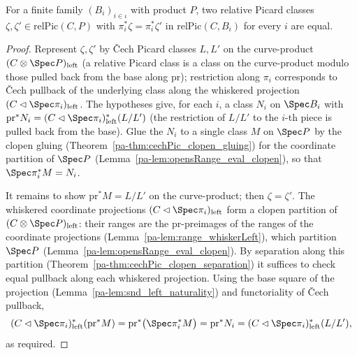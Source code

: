 \begin{theorem}
  \label{pa-thm:relPic_pi_separation}
  \leanok

  For a finite family \((B_i)_{i \in \iota}\) with product \(P\), two relative Picard classes
  \(\zeta, \zeta' \in \mathrm{relPic}(C, P)\) with \(\pi_i^{*}\zeta = \pi_i^{*}\zeta'\) in
  \(\mathrm{relPic}(C, B_i)\) for every \(i\) are equal.
\end{theorem}
\begin{proof}
  \leanok
  Represent \(\zeta, \zeta'\) by \v Cech Picard classes \(L, L'\) on the curve-product
  \((C \otimes \Spec P)_{\mathrm{left}}\) (a relative Picard class is a class on the curve-product
  modulo those pulled back from the base along \(\mathrm{pr}\)); restriction along \(\pi_i\)
  corresponds to \v Cech pullback of the underlying class along the whiskered projection
  \((C \lhd \Spec \pi_i)_{\mathrm{left}}\). The hypotheses give, for each \(i\), a class \(N_i\) on
  \(\Spec B_i\) with \(\mathrm{pr}^{*}N_i = (C \lhd \Spec\pi_i)_{\mathrm{left}}^{*}(L/L')\) (the
  restriction of \(L/L'\) to the \(i\)-th piece is pulled back from the base). Glue the \(N_i\) to a
  single class \(M\) on \(\Spec P\) by the clopen gluing (Theorem~\ref{pa-thm:cechPic_clopen_gluing})
  for the coordinate partition of \(\Spec P\) (Lemma~\ref{pa-lem:opensRange_eval_clopen}), so that
  \(\Spec\pi_i^{*} M = N_i\).

  It remains to show \(\mathrm{pr}^{*} M = L/L'\) on the curve-product; then \(\zeta = \zeta'\). The
  whiskered coordinate projections \((C \lhd \Spec\pi_i)_{\mathrm{left}}\) form a clopen partition
  of \((C \otimes \Spec P)_{\mathrm{left}}\): their ranges are the \(\mathrm{pr}\)-preimages of the
  ranges of the coordinate projections (Lemma~\ref{pa-lem:range_whiskerLeft}), which partition
  \(\Spec P\) (Lemma~\ref{pa-lem:opensRange_eval_clopen}). By separation along this partition
  (Theorem~\ref{pa-thm:cechPic_clopen_separation}) it suffices to check equal pullback along each
  whiskered projection. Using the base square of the projection
  (Lemma~\ref{pa-lem:snd_left_naturality}) and functoriality of \v Cech pullback,
  \[
    (C \lhd \Spec\pi_i)_{\mathrm{left}}^{*}(\mathrm{pr}^{*} M)
      = \mathrm{pr}^{*}\bigl(\Spec\pi_i^{*} M\bigr)
      = \mathrm{pr}^{*} N_i
      = (C \lhd \Spec\pi_i)_{\mathrm{left}}^{*}(L/L'),
  \]
  as required.
\end{proof}

